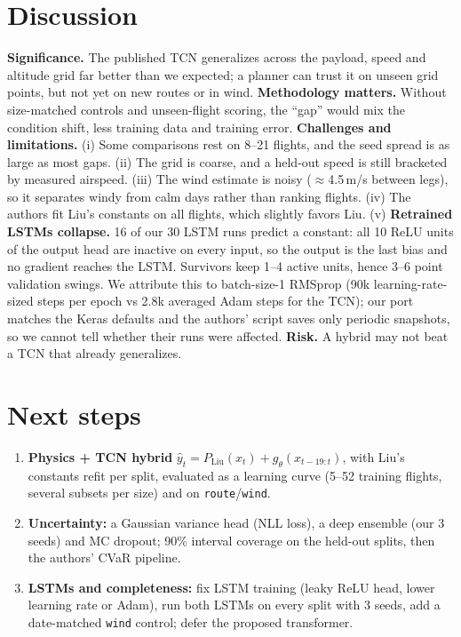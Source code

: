 \documentclass{article}
\begin{document}
\section{Discussion}\label{sec:discussion}
\textbf{Significance.} The published TCN generalizes across the payload, speed and altitude grid far better than
we expected; a planner can trust it on unseen grid points, but not yet on new routes or in wind.
\textbf{Methodology matters.} Without size-matched controls and unseen-flight scoring, the ``gap'' would mix the
condition shift, less training data and training error. \textbf{Challenges and limitations.} (i) Some comparisons
rest on 8--21 flights, and the seed spread is as large as most gaps. (ii) The grid is coarse, and a held-out speed
is still bracketed by measured airspeed. (iii) The wind estimate is noisy ($\approx$4.5\,m/s between
legs), so it separates windy from calm days rather than ranking flights. (iv) The authors fit Liu's
constants on all flights, which slightly favors Liu. (v) \textbf{Retrained LSTMs collapse.} 16 of our 30 LSTM runs
predict a constant: all 10 ReLU units of the output head are inactive on every input, so the output is the last
bias and no gradient reaches the LSTM. Survivors keep 1--4 active units, hence 3--6 point validation swings. We
attribute this to batch-size-1 RMSprop (90k learning-rate-sized steps per epoch vs 2.8k averaged Adam steps for the
TCN); our port matches the Keras defaults and the authors' script saves only periodic snapshots, so we cannot tell
whether their runs were affected. \textbf{Risk.} A hybrid may not beat a TCN that already generalizes.

\section{Next steps}
\begin{enumerate}
\item \textbf{Physics + TCN hybrid} $\hat y_t = P_{\mathrm{Liu}}(x_t) + g_\theta(x_{t-19:t})$, with Liu's constants
refit per split, evaluated as a learning curve (5--52 training flights, several subsets per size) and on
\texttt{route}/\texttt{wind}.
\item \textbf{Uncertainty:} a Gaussian variance head (NLL loss), a deep ensemble (our 3 seeds) and MC dropout; 90\%
interval coverage on the held-out splits, then the authors' CVaR pipeline.
\item \textbf{LSTMs and completeness:} fix LSTM training (leaky ReLU head, lower learning rate or Adam), run both
LSTMs on every split with 3 seeds, add a date-matched \texttt{wind} control; defer the proposed transformer.
\end{enumerate}
\end{document}
